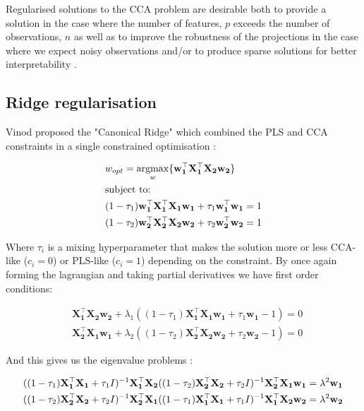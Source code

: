 Regularised solutions to the CCA problem are desirable both to provide a solution in the case where the number of features, $p$ exceeds the number of observations, $n$ as well as to improve the robustness of the projections in the case where we expect noisy observations \cite{branco2005robust} and/or to produce sparse solutions for better interpretability \cite{parkhomenko2009sparse}.

\subsection{Ridge regularisation}\label{sec:Regularised CCA}

Vinod proposed the "Canonical Ridge" which combined the PLS and CCA constraints in a single constrained optimisation \cite{vinod1976canonical}:

\begin{align}
     & w_{opt}=\underset{w}{\mathrm{argmax}}\{\mathbf{w_1^{\top}X_1^{\top}X_2w_2}\}        \\
     & \text{subject to:} \notag                                                           \\
     & (1-\tau_1)\mathbf{w_1^{\top}X_1^{\top}X_1w_1}+\tau_1\mathbf{w_1^{\top}w_1}=1 \notag \\
     & (1-\tau_2)\mathbf{w_2^{\top}X_2^{\top}X_2w_2}+\tau_2\mathbf{w_2^{\top}w_2}=1 \notag
\end{align}

Where $\tau_i$ is a mixing hyperparameter that makes the solution more or less CCA-like ($c_i=0$) or PLS-like ($c_i=1$) depending on the constraint. By once again forming the lagrangian and taking partial derivatives we have first order conditions:

\begin{align}
     & \mathbf{X_1^{\top}X_2w_2} + \lambda_1((1-\tau_1)\mathbf{X_1^{\top}X_1w_1}+\tau_1\mathbf{w_1}-1)=0 \\
     & \mathbf{X_2^{\top}X_1w_1} + \lambda_2((1-\tau_2)\mathbf{X_2^{\top}X_2w_2}+\tau_2\mathbf{w_2}-1)=0
\end{align}

And this gives us the eigenvalue problems \cite{rosipal2005overview}:

\begin{align}
     & ((1-\tau_1)\mathbf{X_1^{\top}X_1}+\tau_1I)^{-1}\mathbf{X_1^{\top}X_2}((1-\tau_2)\mathbf{X_2^{\top}X_2}+\tau_2I)^{-1}\mathbf{X_2^{\top}X_1w_1}=\lambda^2\mathbf{w_1} \notag \\
     & ((1-\tau_2)\mathbf{X_2^{\top}X_2}+\tau_2I)^{-1}\mathbf{X_2^{\top}X_1}((1-\tau_1)\mathbf{X_1^{\top}X_1}+\tau_1I)^{-1}\mathbf{X_1^{\top}X_2w_2}=\lambda^2\mathbf{w_2}
\end{align}

